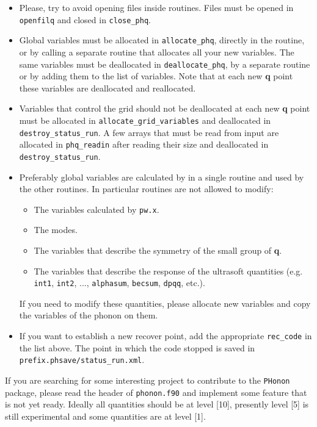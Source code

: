 \documentclass[12pt,a4paper]{article}
\def\pwx{\texttt{pw.x}}
\begin{document}
\begin{itemize}
\item
Please, try to avoid opening files inside routines.
Files must be opened in \texttt{openfilq} and closed in \texttt{close\_phq}.

\item
Global variables must be allocated in \texttt{allocate\_phq}, directly in the 
routine, or by calling a separate routine that allocates all
your new variables. The same variables must be deallocated in 
\texttt{deallocate\_phq}, by a separate routine or by adding them to the
list of variables. Note that at each new {\bf q} point these variables are
deallocated and reallocated. 

\item
Variables that control the grid should not be deallocated at
each new {\bf q} point must be allocated in \texttt{allocate\_grid\_variables} 
and deallocated in \texttt{destroy\_status\_run}.
A few arrays that must be read from input are allocated in 
\texttt{phq\_readin} after reading their size and deallocated in
\texttt{destroy\_status\_run}.

\item
Preferably global variables are calculated by in a single routine 
and used by the other routines. In particular routines are not allowed to 
modify:
\begin{itemize}
\item
  The variables calculated by \pwx.
\item
  The modes.
\item
  The variables that describe the symmetry of the small group of {\bf q}.
\item
  The variables that describe the response of the ultrasoft quantities
        (e.g. \texttt{int1}, \texttt{int2}, ..., \texttt{alphasum}, 
\texttt{becsum}, \texttt{dpqq}, etc.).
\end{itemize}
If you need to modify these quantities, please allocate new variables 
and copy the variables of the phonon on them.

\item
If you want to establish a new recover point, add the appropriate
\texttt{rec\_code} in the list above. The point in which the code stopped 
is saved in \texttt{prefix.phsave/status\_run.xml}. 

\end{itemize}

If you are searching for some interesting project to contribute to the
\texttt{PHonon} package, please read the header of \texttt{phonon.f90}
and implement some feature that is not yet ready. Ideally all quantities
should be at level [10], presently level [5] is still experimental and
some quantities are at level [1].
\end{document}
